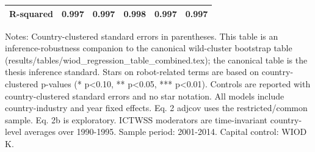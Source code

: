 \begin{table}[!htbp]
\begin{threeparttable}
\begin{tabular}{lccccc}
R-squared & 0.997 & 0.997 & 0.998 & 0.997 & 0.997 \\
\bottomrule
\end{tabular}
\begin{tablenotes}[flushleft]
\footnotesize
\item Notes: Country-clustered standard errors in parentheses. This table is an inference-robustness companion to the canonical wild-cluster bootstrap table (results/tables/wiod\_regression\_table\_combined.tex); the canonical table is the thesis inference standard. Stars on robot-related terms are based on country-clustered p-values (* p<0.10, ** p<0.05, *** p<0.01). Controls are reported with country-clustered standard errors and no star notation. All models include country-industry and year fixed effects. Eq. 2 adjcov uses the restricted/common sample. Eq. 2b is exploratory. ICTWSS moderators are time-invariant country-level averages over 1990-1995. Sample period: 2001-2014. Capital control: WIOD K.
\end{tablenotes}
\end{threeparttable}
\end{table}
